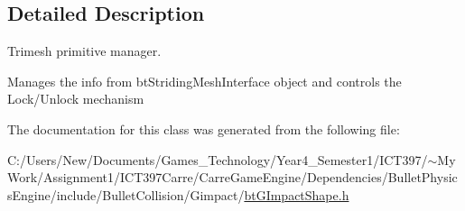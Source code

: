 \subsection{Detailed Description}
Trimesh primitive manager. 

Manages the info from btStridingMeshInterface object and controls the Lock/Unlock mechanism 

The documentation for this class was generated from the following file:\begin{CompactItemize}
\item 
C:/Users/New/Documents/Games\_\-Technology/Year4\_\-Semester1/ICT397/$\sim$My Work/Assignment1/ICT397Carre/CarreGameEngine/Dependencies/BulletPhysicsEngine/include/BulletCollision/Gimpact/\hyperlink{bt_g_impact_shape_8h}{btGImpactShape.h}\end{CompactItemize}

